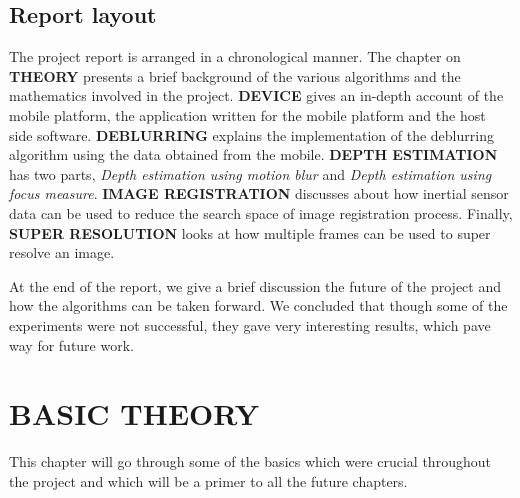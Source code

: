 \documentclass[BTech]{iitmdiss}
\begin{document}
\section{Report layout}
\label{intro:layout}
The project report is arranged in a chronological manner. The chapter on 
\textbf{THEORY} presents a brief background of the various algorithms
and the mathematics involved in the project. \textbf{DEVICE} gives an
in-depth account of the mobile platform, the application written for the
mobile platform and the host side software. \textbf{DEBLURRING} 
explains the implementation of the deblurring algorithm using the data
obtained from the mobile. \textbf{DEPTH ESTIMATION} has two parts, 
\emph{Depth estimation using motion blur} and \emph{Depth estimation 
using focus measure}. \textbf{IMAGE REGISTRATION} discusses about how
inertial sensor data can be used to reduce the search space of image 
registration process. Finally, \textbf{SUPER RESOLUTION} looks at how 
multiple frames can be used to super resolve an image.

At the end of the report, we give a brief discussion the future of the 
project and how the algorithms can be taken forward. We concluded that
though some of the experiments were not successful, they gave very
interesting results, which pave way for future work.

\chapter{BASIC THEORY}
\label{chap:basic_theory}
This chapter will go through some of the basics which were crucial 
throughout the project and which will be a primer to all the future 
chapters.
\end{document}
